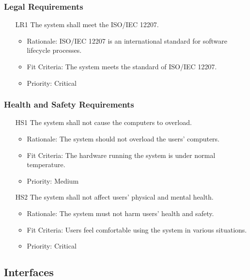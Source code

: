 \documentclass[12pt]{article}
\begin{document}
\subsubsection{Legal Requirements}
\begin{itemize}
    \item[LR1] The system shall meet the ISO/IEC 12207. \label{LR1}
    \begin{itemize}
        \item Rationale: ISO/IEC 12207 is an international standard for software lifecycle processes.
        \item Fit Criteria: The system meets the standard of ISO/IEC 12207.
        \item Priority: Critical
    \end{itemize}
\end{itemize}
\subsubsection{Health and Safety Requirements}
\begin{itemize}
    \item[HS1] The system shall not cause the computers to overload. \label{HS1}
    \begin{itemize}
        \item Rationale: The system should not overload the users’ computers.
        \item Fit Criteria: The hardware running the system is under normal temperature.
        \item Priority: Medium
    \end{itemize}
\end{itemize}
\begin{itemize}
    \item[HS2] The system shall not affect users’ physical and mental health. \label{HS2}
    \begin{itemize}
        \item Rationale: The system must not harm users’ health and safety.
        \item Fit Criteria: Users feel comfortable using the system in various situations.
        \item Priority: Critical
    \end{itemize}
\end{itemize}

\subsection{Interfaces}
\end{document}
